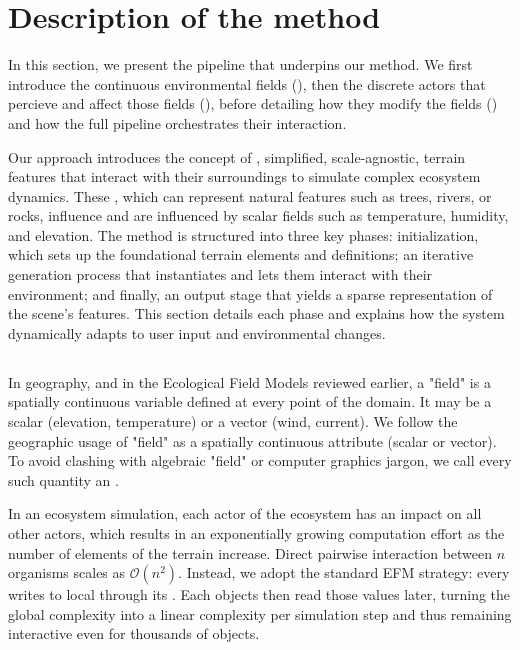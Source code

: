 \section{Description of the method}
\label{sec:env-obj_pipeline}

In this section, we present the pipeline that underpins our method. 
We first introduce the continuous environmental fields (), then the discrete actors that percieve and affect those fields (), before detailing how they modify the fields () and how the full pipeline orchestrates their interaction.

Our approach introduces the concept of , simplified, scale-agnostic, terrain features that interact with their surroundings to simulate complex ecosystem dynamics. These , which can represent natural features such as trees, rivers, or rocks, influence and are influenced by scalar fields such as temperature, humidity, and elevation. The method is structured into three key phases: initialization, which sets up the foundational terrain elements and  definitions; an iterative generation process that instantiates  and lets them interact with their environment; and finally, an output stage that yields a sparse representation of the scene's features. This section details each phase and explains how the system dynamically adapts to user input and environmental changes.

\subsection{}
\label{sec:env-obj_communication}

In geography, and in the Ecological Field Models reviewed earlier, a "field" is a spatially continuous variable defined at every point of the domain.  
It may be a scalar (elevation, temperature) or a vector (wind, current). We follow the geographic usage of "field" as a spatially continuous attribute (scalar or vector). To avoid clashing with algebraic "field" or computer graphics jargon, we call every such quantity an .

In an ecosystem simulation, each actor of the ecosystem has an impact on all other actors, which results in an exponentially growing computation effort as the number of elements of the terrain increase. Direct pairwise interaction between $n$ organisms scales as $\mathcal{O}(n^{2})$.  
Instead, we adopt the standard EFM strategy: every  writes to local  through its .  
Each objects then read those values later, turning the global complexity into a linear complexity per simulation step and thus remaining interactive even for thousands of objects.

